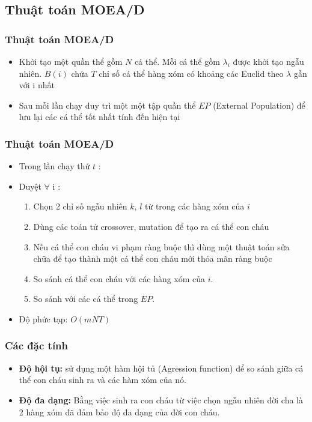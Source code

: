 \documentclass{beamer}
\begin{document}

\subsection{\textbf{Thuật toán MOEA/D}}
    \begin{frame}
    \frametitle{\textbf{Thuật toán MOEA/D}}
        \begin{itemize} 
            \item<1-> Khởi tạo một quần thể gồm $ N $ cá thể. Mỗi cá thể gồm $ \lambda_{i} $ được khởi tạo ngẫu nhiên.
                    $ B(i) $ chứa $ T $ chỉ số cá thể hàng xóm có khoảng các Euclid theo $ \lambda $ gần với i nhất
            \item<2-> Sau mỗi lần chạy duy trì một một tập quần thể $ EP $ (External Population) để lưu
                    lại các cá thể tốt nhất tính đến hiện tại
            
        \end{itemize}
    \end{frame}

    \begin{frame}
    \frametitle{\textbf{Thuật toán MOEA/D}} 
        \begin{itemize}
            \item<1-> Trong lần chạy thứ $ t $ :
            \item<2-> Duyệt $ \forall $ i :
            \begin{enumerate}
                \item<2-> Chọn 2 chỉ số ngẫu nhiên $ k $, $ l $ từ trong các hàng xóm của $ i $
                \item<2-> Dùng các toán tử crossover, mutation để tạo ra cá thể con cháu
                \item<2-> Nếu cá thể con cháu vi phạm ràng buộc thì dùng một thuật toán sửa chữa để tạo thành một
                cá thể con cháu mới thỏa mãn ràng buộc
                \item<3-> So sánh cá thể con cháu với các hàng xóm của $ i $. 
                \item<3-> So sánh với các cá thể trong $ EP $.
            \end{enumerate}
            \item<4-> Độ phức tạp: $ O(mNT) $
        \end{itemize}
    \end{frame}

    \begin{frame}
    \frametitle{\textbf{Các đặc tính}}
        \begin{itemize}
            \item<1-> \textbf{Độ hội tụ:} sử dụng một hàm hội tủ (Agression function)
            để so sánh giữa cá thể con cháu sinh ra và các hàm xóm của nó.
            \item<2-> \textbf{Độ đa dạng:} Bằng việc sinh ra con cháu từ việc chọn ngẫu
            nhiên đời cha là 2 hàng xóm đã đảm bảo độ đa dạng của đời con cháu.
        \end{itemize}

    \end{frame}
\end{document}
